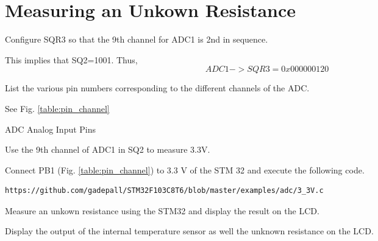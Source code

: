 \documentclass[journal,12pt,twocolumn]{IEEEtran}
\begin{document}
\section{Measuring an Unkown Resistance}
\begin{problem}
Configure SQR3 so that the 9th channel for ADC1 is 2nd in sequence.
\end{problem}
\solution This implies that SQ2=1001.  Thus,
\begin{equation}
ADC1->SQR3 = 0x000000120
\end{equation}
\begin{problem}
List the various pin numbers corresponding to the different channels 
of the ADC.
\end{problem}
\solution See Fig. \ref{table:pin_channel}
\begin{table}[!h]
\footnotesize

\caption{ADC Analog Input Pins}
\label{table:pin_channel}
\end{table}
\begin{problem}
Use the 9th channel of  ADC1 in SQ2 to measure 3.3V. 
\end{problem}
\solution Connect PB1 (Fig. \ref{table:pin_channel}) to 3.3 V of the STM 32 and execute the following
code.
\begin{lstlisting}
https://github.com/gadepall/STM32F103C8T6/blob/master/examples/adc/3_3V.c
\end{lstlisting}
\begin{problem}
Measure an unkown resistance using the STM32 and display the result 
on the LCD.
\end{problem}
\begin{problem}
Display the output of the internal temperature sensor as well
the unknown resistance on the LCD.
\end{problem}
\end{document}
